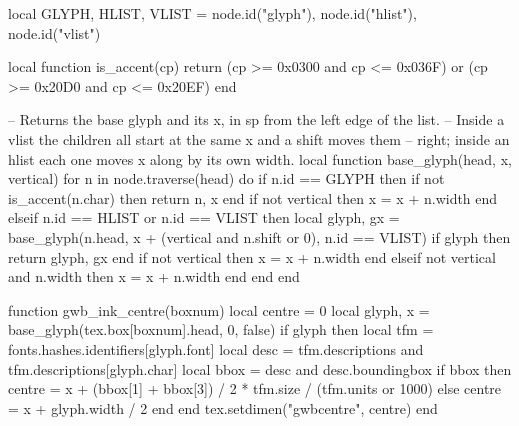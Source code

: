 

\newdimen\gwbcentre

\begin{luacode*}
local GLYPH, HLIST, VLIST = node.id("glyph"), node.id("hlist"), node.id("vlist")

local function is_accent(cp)
  return (cp >= 0x0300 and cp <= 0x036F) or (cp >= 0x20D0 and cp <= 0x20EF)
end

-- Returns the base glyph and its x, in sp from the left edge of the list.
-- Inside a vlist the children all start at the same x and a shift moves them
-- right; inside an hlist each one moves x along by its own width.
local function base_glyph(head, x, vertical)
  for n in node.traverse(head) do
    if n.id == GLYPH then
      if not is_accent(n.char) then return n, x end
      if not vertical then x = x + n.width end
    elseif n.id == HLIST or n.id == VLIST then
      local glyph, gx = base_glyph(n.head, x + (vertical and n.shift or 0),
                                   n.id == VLIST)
      if glyph then return glyph, gx end
      if not vertical then x = x + n.width end
    elseif not vertical and n.width then
      x = x + n.width
    end
  end
end

function gwb_ink_centre(boxnum)
  local centre = 0
  local glyph, x = base_glyph(tex.box[boxnum].head, 0, false)
  if glyph then
    local tfm = fonts.hashes.identifiers[glyph.font]
    local desc = tfm.descriptions and tfm.descriptions[glyph.char]
    local bbox = desc and desc.boundingbox
    if bbox then
      centre = x + (bbox[1] + bbox[3]) / 2 * tfm.size / (tfm.units or 1000)
    else
      centre = x + glyph.width / 2
    end
  end
  tex.setdimen("gwbcentre", centre)
end
\end{luacode*}

